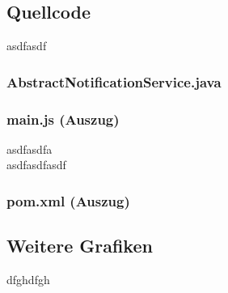 \clearpage

\subsection{Quellcode}
\label{app:Quellcode}
asdfasdf

\subsubsection{AbstractNotificationService.java}
\label{app:AbstractNotificationService}


\subsubsection{main.js (Auszug)}
\label{app:main.js}
asdfasdfa \\
 asdfasdfasdf


\subsubsection{pom.xml (Auszug)}
\label{app:pom.xml}


\clearpage

\subsection{Weitere Grafiken}
\label{app:Grafiken}
dfghdfgh

